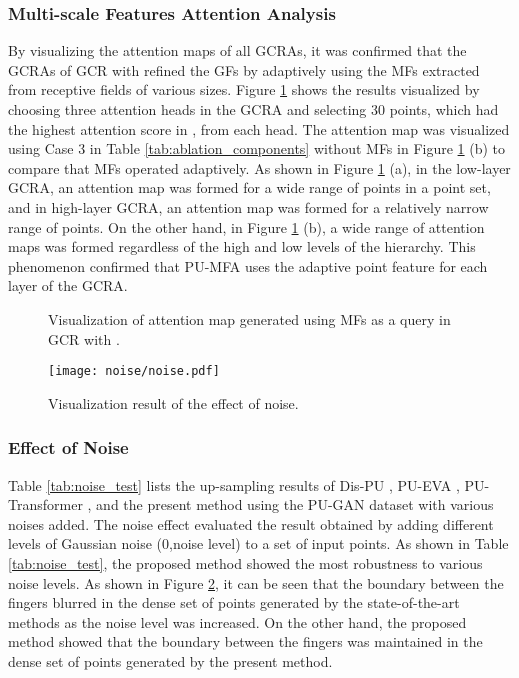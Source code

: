 \documentclass{article}
\begin{document}
\subsubsection{Multi-scale Features Attention Analysis}
\quad By visualizing the attention maps of all GCRAs, it was confirmed that the GCRAs of GCR with  refined the GFs by adaptively using the MFs extracted from receptive fields of various sizes. Figure \ref{fig:attention_map} shows the results visualized by choosing three attention heads in the GCRA and selecting 30 points, which had the highest attention score in , from each head. The attention map was visualized using Case 3 in Table \ref{tab:ablation_components} without MFs in Figure \ref{fig:attention_map} (b) to compare that MFs operated adaptively. As shown in Figure \ref{fig:attention_map} (a), in the low-layer GCRA, an attention map was formed for a wide range of points in a point set, and in high-layer GCRA, an attention map was formed for a relatively narrow range of points. On the other hand, in Figure \ref{fig:attention_map} (b), a wide range of attention maps was formed regardless of the high and low levels of the hierarchy. This phenomenon confirmed that PU-MFA uses the adaptive point feature for each layer of the GCRA.

\begin{figure}[htb!]
  \centering
  
  \caption{Visualization of attention map generated using MFs as a query in GCR with .}
    \label{fig:attention_map}
\end{figure}

\begin{figure}[htb!]
  \centering
\texttt{[image: noise/noise.pdf]} 
  \caption{Visualization result of the effect of noise.}
    \label{fig:noisy_quality}
\end{figure}

\subsubsection{Effect of Noise}
\quad Table \ref{tab:noise_test} lists the  up-sampling results of Dis-PU \cite{li2021point}, PU-EVA \cite{luo2021pu}, PU-Transformer \cite{qiu2021pu}, and the present method using the PU-GAN dataset with various noises added. The noise effect evaluated the result obtained by adding different levels of Gaussian noise (0,noise level) to a set of input points. As shown in Table \ref{tab:noise_test}, the proposed method showed the most robustness to various noise levels. As shown in Figure \ref{fig:noisy_quality}, it can be seen that the boundary between the fingers blurred in the dense set of points generated by the state-of-the-art methods as the noise level was increased. On the other hand, the proposed method showed that the boundary between the fingers was maintained in the dense set of points generated by the present method.
\end{document}

